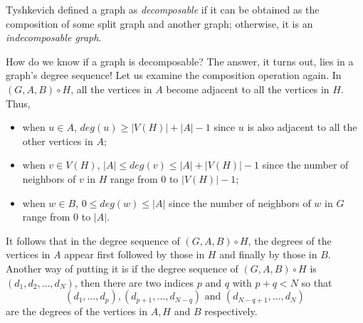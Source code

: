 \documentclass[11pt]{article}
\begin{document}
Tyshkevich defined a graph as {\it decomposable} if it can be obtained as the composition of some split graph and another graph; otherwise, it is an {\it indecomposable graph}.  %





How do we know if a graph is decomposable?  The answer, it turns out, lies in a graph's degree sequence!  Let us examine the composition operation again. In $(G, A, B) \circ H$, all the vertices in $A$ become adjacent to all the vertices in $H$. %
Thus,
\begin{itemize}
\item when $u \in A$, $deg(u) \ge |V(H)| + |A| -1 $ since $u$ is also adjacent to all the other vertices in $A$; 
\item when  $v \in V(H)$, $|A| \leq deg(v) \leq |A| + |V(H)|-1$ since the number of neighbors of $v$ in $H$ range from $0$ to $|V(H)|-1$;
\item when $w \in B$, $0 \leq deg(w) \leq |A|$ since the number of neighbors of $w$ in $G$ range from $0$ to $|A|$.
\end{itemize}
 It follows that in the degree sequence of  $(G, A, B) \circ H$, the degrees of the vertices in $A$ appear first followed by those in $H$ and finally by those in $B$.  %
  Another way of putting it is  if the degree sequence of $(G, A, B) \circ H$ is $(d_1, d_2, \hdots, d_N)$, then   there are two indices $p$ and $q$ with $p + q < N$ so that $$(d_1, \hdots, d_p), (d_{p+1}, \hdots, d_{N-q}) \mbox{ and } (d_{N-q+1}, \hdots, d_N)$$
 are the degrees of the vertices in $A, H$ and $B$ respectively.   %
\end{document}
